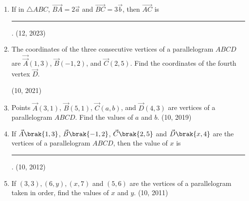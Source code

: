 \begin{enumerate}[label=\thesubsection.\arabic*, ref=\thesubsection.\theenumi]
    \item If in $\triangle ABC$, $\overrightarrow{BA} = 2\vec{a}$ and $\overrightarrow{BC} = 3\vec{b}$, then $\overrightarrow{AC}$ is
\rule{1cm}{0.2pt}.
    \hfill (12, 2023)
	\item The coordinates of the three consecutive vertices of a parallelogram $ABCD$ are $\vec{\vec{A}}(1, 3)$, $\vec{B}(-1, 2)$, and $\vec{C}(2, 5)$. Find the coordinates of the fourth vertex $\vec{D}$. 

		\hfill (10, 2021)
\item Points $\vec{A}(3, 1)$, $\vec{B}(5, 1)$, $\vec{C}(a, b)$, and $\vec{D}(4, 3)$ are vertices of a parallelogram $ABCD$. Find the values of $a$ and $b$. \hfill (10, 2019)
\item If $\vec{A}\brak{1,3}$, $\vec{B}\brak{-1,2}$, $\vec{C}\brak{2,5}$ and $\vec{D}\brak{x,4}$ are the vertices of a parallelogram $ABCD$, then the value of $x$ is
\rule{1cm}{0.2pt}.
\hfill (10, 2012)
    \item If $(3,3),(6,y),(x,7)$ and $(5,6)$ are the vertices of a parallelogram taken in order, find the values of $x$ and $y$.
\hfill (10, 2011)
\end{enumerate}
